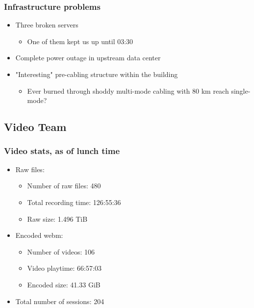 \documentclass[t]{beamer}
\begin{document}
\begin{frame}
	\frametitle{Infrastructure problems}
	\begin{itemize}
		\item Three broken servers
		\begin{itemize}
			\item One of them kept us up until 03:30
		\end{itemize}
		\item Complete power outage in upstream data center
		\item "Interesting" pre-cabling structure within the building
		\begin{itemize}
			\item Ever burned through shoddy multi-mode cabling with 80 km reach single-mode?
		\end{itemize}
	\end{itemize}
\end{frame}

\subsection{Video Team}

\begin{frame}
	\frametitle{Video stats, as of lunch time}
	\begin{itemize}
		\item Raw files:
		\begin{itemize}
			\item Number of raw files: 480
			\item Total recording time: 126:55:36
			\item Raw size: 1.496 TiB
		\end{itemize}
		\item Encoded webm:
		\begin{itemize}
			\item Number of videos: 106
			\item Video playtime: 66:57:03
			\item Encoded size: 41.33 GiB
		\end{itemize}
		\item Total number of sessions: 204
	\end{itemize}
\end{frame}
\end{document}
